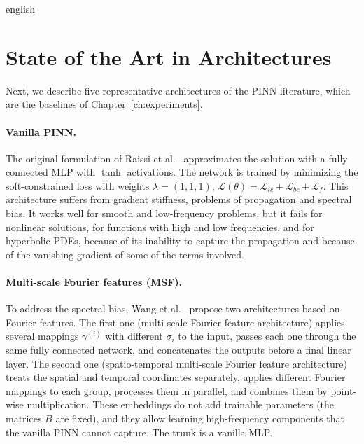 \documentclass[12pt,letterpaper,twoside]{book}
\newcommand{\Loss}{\mathcal{L}}
\begin{document}
\begin{hyphenrules}{english}
\section{State of the Art in Architectures}\label{sec:architectures}

Next, we describe five representative architectures of the PINN literature, which are the baselines of
Chapter~\ref{ch:experiments}.

\paragraph{Vanilla PINN.}
The original formulation of Raissi et al.~\cite{raissi2019} approximates the solution with a fully connected MLP
with $\tanh$ activations. The network is trained by minimizing the soft-constrained loss with weights
$\lambda=(1,1,1)$, $\Loss(\theta)=\Loss_{ic}+\Loss_{bc}+\Loss_f$. This architecture suffers from gradient
stiffness, problems of propagation and spectral bias. It works well for smooth and low-frequency
problems, but it fails for nonlinear solutions, for functions with high and low frequencies, and for
hyperbolic PDEs, because of its inability to capture the propagation and because of the vanishing gradient
of some of the terms involved.

\paragraph{Multi-scale Fourier features (MSF).}
To address the spectral bias, Wang et al.~\cite{wang2021eigenvector} propose two architectures based on Fourier
features. The first one (multi-scale Fourier feature architecture) applies several mappings
$\gamma^{(i)}$ with different $\sigma_i$ to the input, passes each one through the same fully connected
network, and concatenates the outputs before a final linear layer. The second one (spatio-temporal
multi-scale Fourier feature architecture) treats the spatial and temporal coordinates separately, applies
different Fourier mappings to each group, processes them in parallel, and combines them by point-wise
multiplication. These embeddings do not add trainable parameters (the matrices $B$ are fixed), and they
allow learning high-frequency components that the vanilla PINN cannot capture. The trunk is a vanilla MLP.


\end{hyphenrules}
\end{document}
